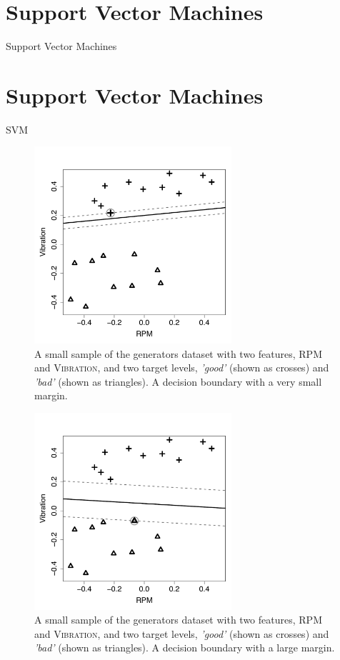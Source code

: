 \documentclass[xcolor={table}]{beamer}
\newcommand{\SectionSlideShortHeader}[3][]{
	\ifthenelse{\isempty{#1}}
		{\section[#3]{#2}\begin{frame} \begin{center}\begin{huge}#2\end{huge}\end{center}\end{frame}}
		{\section[#1]{#2}\begin{frame} \begin{center}\begin{huge}#3\end{huge}\end{center}\end{frame}}
}
\newcommand{\featN}[1]{\textsc{#1}}
\newcommand{\featL}[1]{\textit{'#1'}}
\begin{document}
\SectionSlideShortHeader{Support Vector Machines}{SVM}

 \begin{frame}[plain]
 \begin{center}
\begin{figure}[htb]
\includegraphics[width=0.65\textwidth]{./images/svmBadMarginImage.pdf}
\caption{A small sample of the generators dataset with two features, \featN{RPM} and \featN{Vibration}, and two target levels, \featL{good} (shown as crosses) and \featL{bad} (shown as triangles). A decision boundary with a very small margin.}
\label{fig:svmDemoBad}
\end{figure}
\end{center}
\end{frame} 

 \begin{frame}[plain] 
 \begin{center}
\begin{figure}[htb]
\includegraphics[width=0.65\textwidth]{./images/svmGoodMarginImage}
\caption{A small sample of the generators dataset with two features, \featN{RPM} and \featN{Vibration}, and two target levels, \featL{good} (shown as crosses) and \featL{bad} (shown as triangles). A decision boundary with a large margin.}
\label{fig:svmDemoGood}
\end{figure}
\end{center}
\end{frame} 
\end{document}

